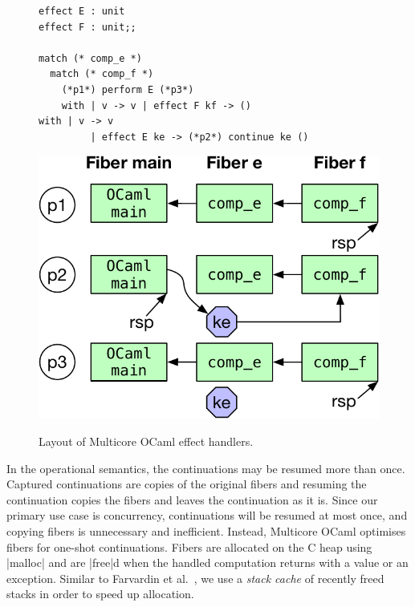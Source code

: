 \documentclass[sigplan,screen]{acmart}
\begin{document}
\begin{figure}
\begin{minipage}{0.64\linewidth}
\begin{minipage}{\linewidth}
    \label{fig:mcstack}
  \end{minipage}
  \begin{minipage}{0.55\linewidth}
		\vspace{1mm}
    \begin{lstlisting}
effect E : unit
effect F : unit;;

match (* comp_e *)
  match (* comp_f *)
    (*p1*) perform E (*p3*)
	with | v -> v | effect F kf -> ()
with | v -> v
		 | effect E ke -> (*p2*) continue ke ()
    \end{lstlisting}
		\label{code:effimpl}
  \end{minipage}
  \begin{minipage}{0.44\linewidth}
		\vspace{2mm}
    \centering
    \includegraphics[scale=0.42]{figures/fiber_handler}
    \label{fig:fiber_handler}
  \end{minipage}
\end{minipage}
\caption{Layout of Multicore OCaml effect handlers.}
\end{figure}

In the operational semantics, the continuations may be resumed more than once.
Captured continuations are copies of the original fibers and resuming the
continuation copies the fibers and leaves the continuation as it is. Since our
primary use case is concurrency, continuations will be resumed at most once, and
copying fibers is unnecessary and inefficient. Instead, Multicore OCaml
optimises fibers for one-shot continuations. Fibers are allocated on the C heap
using |malloc| and are |free|d when the handled computation returns with a value
or an exception. Similar to Farvardin et al.~\cite{Farvardin20}, we use a
\emph{stack cache} of recently freed stacks in order to speed up allocation.
\end{document}
